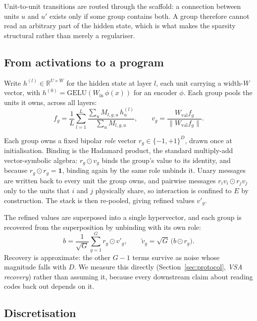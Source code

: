 Unit-to-unit transitions are routed through the scaffold: a connection between
units $u$ and $u'$ exists only if some group contains both. A group therefore
cannot read an arbitrary part of the hidden state, which is what makes the
sparsity structural rather than merely a regulariser.

\subsection{From activations to a program}

Write $h^{(l)} \in \mathbb{R}^{U \times W}$ for the hidden state at layer $l$,
each unit carrying a width-$W$ vector, with
$h^{(0)} = \mathrm{GELU}(W_{\text{in}}\, \phi(x))$ for an encoder $\phi$. Each
group pools the units it owns, across all layers:
\begin{equation}
  f_g = \frac{1}{L}\sum_{l=1}^{L}
        \frac{\sum_{u} M_{l,g,u}\, h^{(l)}_u}{\sum_{u} M_{l,g,u}},
  \qquad
  v_g = \frac{W_{\text{val}} f_g}{\lVert W_{\text{val}} f_g \rVert}.
  \label{eq:pool}
\end{equation}

Each group owns a fixed bipolar \emph{role} vector $r_g \in \{-1,+1\}^{D}$,
drawn once at initialisation. Binding is the Hadamard product, the standard
multiply-add vector-symbolic algebra: $r_g \odot v_g$ binds the group's value to
its identity, and because $r_g \odot r_g = \mathbf{1}$, binding again by the
same role unbinds it. Unary messages are written back to every unit the group
owns, and pairwise messages $r_i v_i \odot r_j v_j$ only to the units that $i$
and $j$ physically share, so interaction is confined to $E$ by construction.
The stack is then re-pooled, giving refined values $v'_g$.

The refined values are superposed into a single hypervector, and each group is
recovered from the superposition by unbinding with its own role:
\begin{equation}
  b = \frac{1}{\sqrt{G}}\sum_{g=1}^{G} r_g \odot v'_g,
  \qquad
  \tilde{v}_g = \sqrt{G}\, \bigl( b \odot r_g \bigr).
  \label{eq:bundle}
\end{equation}
Recovery is approximate: the other $G-1$ terms survive as noise whose magnitude
falls with $D$. We measure this directly (Section~\ref{sec:protocol},
\emph{VSA recovery}) rather than assuming it, because every downstream claim
about reading codes back out depends on it.

\subsection{Discretisation}

